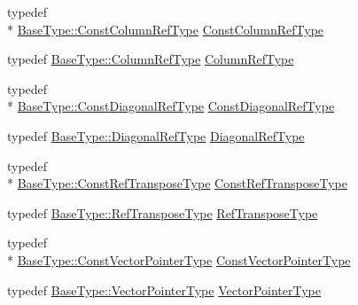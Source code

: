 \begin{DoxyCompactItemize}
\item 
typedef \\*
\hyperlink{classvct_dynamic_const_matrix_base_ac8caf37f979246b1ae99d6e6876879e0}{Base\-Type\-::\-Const\-Column\-Ref\-Type} \hyperlink{classvct_dynamic_matrix_base_a744dadc203a40ef15678bca262d09aad}{Const\-Column\-Ref\-Type}
\item 
typedef \hyperlink{classvct_dynamic_const_matrix_base_a232026578d12a51aa5228dee998b5663}{Base\-Type\-::\-Column\-Ref\-Type} \hyperlink{classvct_dynamic_matrix_base_a6fabbe3b8fdbfbb4a53f90622a520699}{Column\-Ref\-Type}
\item 
typedef \\*
\hyperlink{classvct_dynamic_const_matrix_base_aa497314340719c9e70a4991d3f306d7e}{Base\-Type\-::\-Const\-Diagonal\-Ref\-Type} \hyperlink{classvct_dynamic_matrix_base_ade45bdec8e92cad6e570939dc15d5450}{Const\-Diagonal\-Ref\-Type}
\item 
typedef \hyperlink{classvct_dynamic_const_matrix_base_a2773e894d2ce8aa7a479eeecc535ac33}{Base\-Type\-::\-Diagonal\-Ref\-Type} \hyperlink{classvct_dynamic_matrix_base_a594a79de6406a638f5e725daa76294a6}{Diagonal\-Ref\-Type}
\item 
typedef \\*
\hyperlink{classvct_dynamic_const_matrix_base_a2ee053ef5a591f470076e2a0c215fa44}{Base\-Type\-::\-Const\-Ref\-Transpose\-Type} \hyperlink{classvct_dynamic_matrix_base_a31dd42ab337cbc881f843c09aa141288}{Const\-Ref\-Transpose\-Type}
\item 
typedef \hyperlink{classvct_dynamic_const_matrix_base_afff0f3bee56a8562e0ec772b35e24475}{Base\-Type\-::\-Ref\-Transpose\-Type} \hyperlink{classvct_dynamic_matrix_base_a21a1c69f7e029b28a2884718ac9c297b}{Ref\-Transpose\-Type}
\item 
typedef \\*
\hyperlink{classvct_dynamic_const_matrix_base_ae4eb1369d9d05fdf98786c5583834e73}{Base\-Type\-::\-Const\-Vector\-Pointer\-Type} \hyperlink{classvct_dynamic_matrix_base_ac8edef5d93a5e13b019a0c12744ddd18}{Const\-Vector\-Pointer\-Type}
\item 
typedef \hyperlink{classvct_dynamic_const_matrix_base_aa3fdaf7217ea2667db03af719c3371c4}{Base\-Type\-::\-Vector\-Pointer\-Type} \hyperlink{classvct_dynamic_matrix_base_a58735349c10ccb0b0b1708b52e3a1569}{Vector\-Pointer\-Type}
\end{DoxyCompactItemize}
